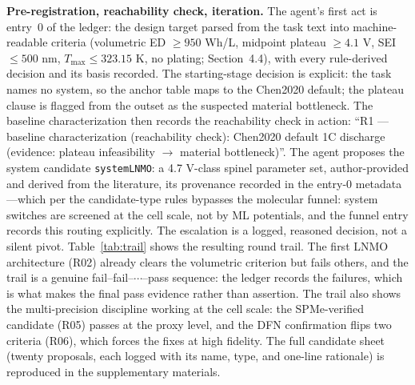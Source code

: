 \textbf{Pre-registration, reachability check, iteration.} The agent's
first act is entry~0 of the ledger: the design target parsed from the task text
into machine-readable criteria (volumetric ED $\geq 950$ Wh/L, midpoint
plateau $\geq 4.1$ V, SEI $\leq 500$ nm, $T_{\max}\leq 323.15$ K, no
plating; Section~4.4), with every rule-derived decision and its basis
recorded. The starting-stage decision is explicit: the task names no
system, so the anchor table maps to the Chen2020 default; the plateau
clause is flagged from the outset as the suspected material bottleneck.
The baseline characterization then records the reachability check in
action: ``R1 --- baseline characterization (reachability check): Chen2020
default 1C discharge (evidence: plateau infeasibility $\rightarrow$
material bottleneck)''. The agent proposes the system candidate
\texttt{systemLNMO}: a 4.7 V-class spinel parameter set, author-provided
and derived from the literature, its provenance recorded in the entry-0
metadata---which per the candidate-type rules bypasses the molecular
funnel: system switches are screened at the cell scale, not by ML
potentials, and the funnel entry records this routing explicitly. The
escalation is a logged, reasoned decision, not a silent pivot.
Table~\ref{tab:trail} shows the resulting round trail. The first LNMO
architecture (R02) already clears the volumetric criterion but fails
others, and the trail is a genuine fail--fail--$\cdots$--pass sequence: the
ledger records the failures, which is what makes the final pass evidence
rather than assertion. The trail also shows the multi-precision discipline
working at the cell scale: the SPMe-verified candidate (R05) passes at the
proxy level, and the DFN confirmation flips two criteria (R06), which
forces the fixes at high fidelity. The full candidate sheet (twenty
proposals, each logged with its name, type, and one-line rationale) is
reproduced in the supplementary materials.

